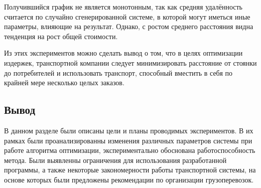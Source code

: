 Получившийся график не является монотонным, так как средняя удалённость считается по случайно сгенерированной системе, в которой могут иметься иные параметры, влияющие на результат. Однако, с ростом среднего расстояния видна тенденция на рост общей стоимости. 

Из этих экспериментов можно сделать вывод о том, что в целях оптимизации издержек, транспортной компании следует минимизировать расстояние от стоянки до потребителей и использовать транспорт, способный вместить в себя по крайней мере несколько целых заказов.

\subsection*{Вывод}
В данном разделе были описаны цели и планы проводимых экспериментов. В их рамках были проанализированны изменения различных параметров системы при работе алгоритма оптимизации, экспериментально обоснована работоспособность метода. Были выявленны ограничения для использования разработанной программы, а также некоторые закономерности работы транспортной системы, на основе которых были предложены рекомендации по организации грузоперевозок. 

\pagebreak